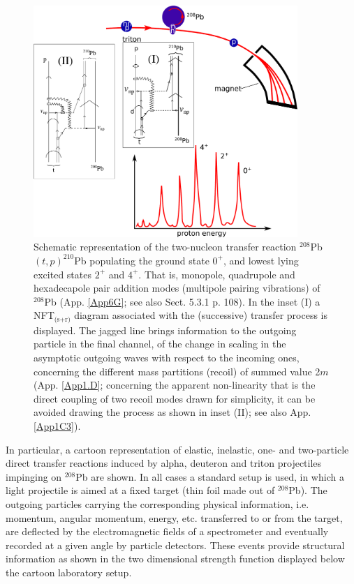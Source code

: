 \begin{figure}
\centerline {
\includegraphics*[width=10cm]{introduccion/figs/figintro3}
}
\caption[Two-nucleon transfer reaction $^{208}$Pb$(t,p)^{210}$Pb]{Schematic representation of the two-nucleon transfer reaction $^{208}$Pb$(t,p)^{210}$Pb  populating the ground state $0^+$, and lowest lying excited states $2^+$ and $4^+$.  That is, monopole, quadrupole and hexadecapole pair addition modes (multipole pairing vibrations) of $^{208}$Pb   (App. \ref{App6G}; see also \cite{Brink:05} Sect. 5.3.1 p. 108). In the inset (I) a NFT$_{\text{(s+r)}}$ diagram associated with the (successive) transfer process is displayed. The jagged line brings information to the outgoing particle in the final channel, of the change in scaling in the asymptotic outgoing waves with respect to the incoming ones, concerning the different mass partitions (recoil) of summed value 2$m$ (App. \ref{App1.D}; concerning the apparent non-linearity that is the direct coupling of two recoil modes drawn for simplicity, it can be avoided drawing the process as shown in inset (II); see also App. \ref{App1C3}).}
\label{figintro3}
\end{figure}
In particular, a cartoon representation of elastic, inelastic, one- and two-particle direct transfer reactions induced by alpha, deuteron and triton  projectiles impinging on $^{208}$Pb are shown. In all cases a standard setup is used, in which a light projectile is aimed at a fixed target (thin foil made out of $^{208}$Pb). The outgoing particles carrying the corresponding physical information, i.e. momentum, angular momentum, energy, etc. transferred to or from the target, are deflected by the electromagnetic fields of a spectrometer and eventually recorded at a given angle by particle detectors. These events provide structural information as shown in the two dimensional strength function displayed below the cartoon laboratory setup. 

